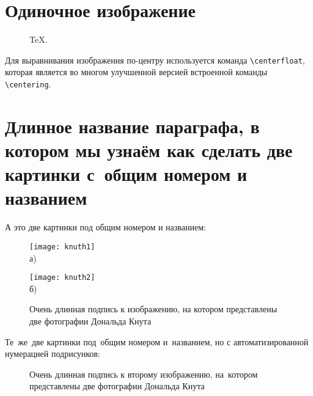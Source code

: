 \section{Одиночное изображение}\label{sec:ch2/sec12}

\begin{figure}[ht]
  \caption{TeX.}\label{fig:latex}
\end{figure}

Для выравнивания изображения по-центру используется команда \verb+\centerfloat+, которая является во
многом улучшенной версией встроенной команды \verb+\centering+.

\section{Длинное название параграфа, в котором мы узнаём как сделать две картинки с~общим номером и названием}\label{sec:ch2/sect2}

А это две картинки под общим номером и названием:
\begin{figure}[ht]
  \begin{minipage}[b][][b]{0.49\linewidth}\centering
    \texttt{[image: knuth1]} \\ а)
  \end{minipage}
  \hfill
  \begin{minipage}[b][][b]{0.49\linewidth}\centering
    \texttt{[image: knuth2]} \\ б)
  \end{minipage}
  \caption{Очень длинная подпись к изображению,
      на котором представлены две фотографии Дональда Кнута}
  \label{fig:knuth}
\end{figure}

Те~же~две картинки под~общим номером и~названием,
но с автоматизированной нумерацией подрисунков:
\begin{figure}[ht]
    \caption[Этот текст попадает в названия рисунков в списке рисунков]{Очень
    длинная подпись к второму изображению, на~котором представлены две
    фотографии Дональда Кнута}\label{fig:knuth_2}
\end{figure}

